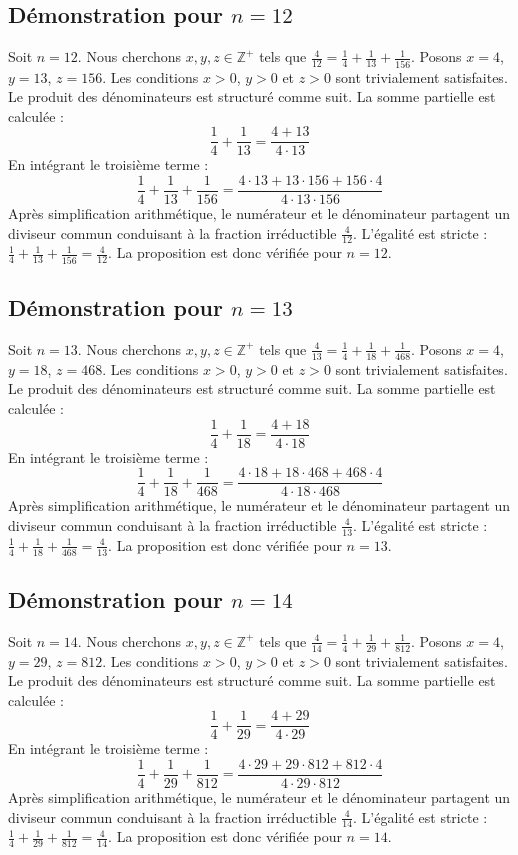 \documentclass[11pt,a4paper]{article}
\begin{document}
\subsection{Démonstration pour $n = 12$}
Soit $n = 12$. Nous cherchons $x, y, z \in \mathbb{Z}^{+}$ tels que $\frac{4}{12} = \frac{1}{4} + \frac{1}{13} + \frac{1}{156}$.
Posons $x = 4$, $y = 13$, $z = 156$.
Les conditions $x > 0$, $y > 0$ et $z > 0$ sont trivialement satisfaites.
Le produit des dénominateurs est structuré comme suit. La somme partielle est calculée :
$$ \frac{1}{4} + \frac{1}{13} = \frac{4+13}{4 \cdot 13} $$
En intégrant le troisième terme :
$$ \frac{1}{4} + \frac{1}{13} + \frac{1}{156} = \frac{4 \cdot 13 + 13 \cdot 156 + 156 \cdot 4}{4 \cdot 13 \cdot 156} $$
Après simplification arithmétique, le numérateur et le dénominateur partagent un diviseur commun conduisant à la fraction irréductible $\frac{4}{12}$.
L'égalité est stricte : $\frac{1}{4} + \frac{1}{13} + \frac{1}{156} = \frac{4}{12}$.
La proposition est donc vérifiée pour $n = 12$.
\subsection{Démonstration pour $n = 13$}
Soit $n = 13$. Nous cherchons $x, y, z \in \mathbb{Z}^{+}$ tels que $\frac{4}{13} = \frac{1}{4} + \frac{1}{18} + \frac{1}{468}$.
Posons $x = 4$, $y = 18$, $z = 468$.
Les conditions $x > 0$, $y > 0$ et $z > 0$ sont trivialement satisfaites.
Le produit des dénominateurs est structuré comme suit. La somme partielle est calculée :
$$ \frac{1}{4} + \frac{1}{18} = \frac{4+18}{4 \cdot 18} $$
En intégrant le troisième terme :
$$ \frac{1}{4} + \frac{1}{18} + \frac{1}{468} = \frac{4 \cdot 18 + 18 \cdot 468 + 468 \cdot 4}{4 \cdot 18 \cdot 468} $$
Après simplification arithmétique, le numérateur et le dénominateur partagent un diviseur commun conduisant à la fraction irréductible $\frac{4}{13}$.
L'égalité est stricte : $\frac{1}{4} + \frac{1}{18} + \frac{1}{468} = \frac{4}{13}$.
La proposition est donc vérifiée pour $n = 13$.
\subsection{Démonstration pour $n = 14$}
Soit $n = 14$. Nous cherchons $x, y, z \in \mathbb{Z}^{+}$ tels que $\frac{4}{14} = \frac{1}{4} + \frac{1}{29} + \frac{1}{812}$.
Posons $x = 4$, $y = 29$, $z = 812$.
Les conditions $x > 0$, $y > 0$ et $z > 0$ sont trivialement satisfaites.
Le produit des dénominateurs est structuré comme suit. La somme partielle est calculée :
$$ \frac{1}{4} + \frac{1}{29} = \frac{4+29}{4 \cdot 29} $$
En intégrant le troisième terme :
$$ \frac{1}{4} + \frac{1}{29} + \frac{1}{812} = \frac{4 \cdot 29 + 29 \cdot 812 + 812 \cdot 4}{4 \cdot 29 \cdot 812} $$
Après simplification arithmétique, le numérateur et le dénominateur partagent un diviseur commun conduisant à la fraction irréductible $\frac{4}{14}$.
L'égalité est stricte : $\frac{1}{4} + \frac{1}{29} + \frac{1}{812} = \frac{4}{14}$.
La proposition est donc vérifiée pour $n = 14$.
\end{document}
